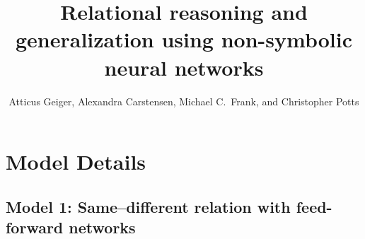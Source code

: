 
\title{Relational reasoning and generalization using non-symbolic neural networks}
\author{Atticus Geiger, Alexandra Carstensen, Michael C.~Frank, and Christopher Potts}








\maketitle

\SItext

\section{Model Details}


\subsection{Model 1: Same--different relation with feed-forward  networks}\label{sec:model1}


